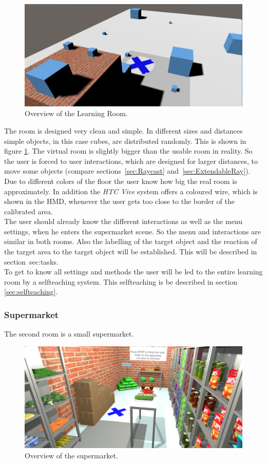 \begin{figure}[H] 
	\center 
	\includegraphics[width=12cm]{Images/learningRoom2.PNG}			
	\caption[Overview of the Learning Room.]{Overview of the Learning Room.}
	\label{fig:learning room}
\end{figure}

The room is designed very clean and simple. In different sizes and distances simple objects, in this case cubes, are distributed randomly. This is shown in figure \ref{fig:learning room}. The virtual room is slightly bigger than the usable room in reality. So the user is forced to user interactions, which are designed for larger distances, to move some objects (compare sections~\ref{sec:Raycast} and~\ref{sec:ExtendableRay}). Due to different colors of the floor the user know how big the real room is approximately. In addition the \textit{HTC Vive} system offers a coloured wire, which is shown in the HMD, whenever the user gets too close to the border of the calibrated area.\\
The user should already know the different interactions as well as the menu settings, when he enters the supermarket scene. So the menu and interactions are similar in both rooms. Also the labelling of the target object and the reaction of the target area to the target object will be established. This will be described in section~{sec:tasks}.\\ 
To get to know all settings and methods the user will be led to the entire learning room by a selfteaching system. This selfteaching is be described in section \ref{sec:selfteaching}. 


\subsubsection{Supermarket} \label{sec:supermarket} 
The second room is a small supermarket. 

\begin{figure}[H] 
	\center 
	\includegraphics[width=12cm]{Images/supermarket.PNG}
	\caption[Overview of the supermarket.]{Overview of the supermarket.}
	\label{fig:supermarket}
\end{figure}

